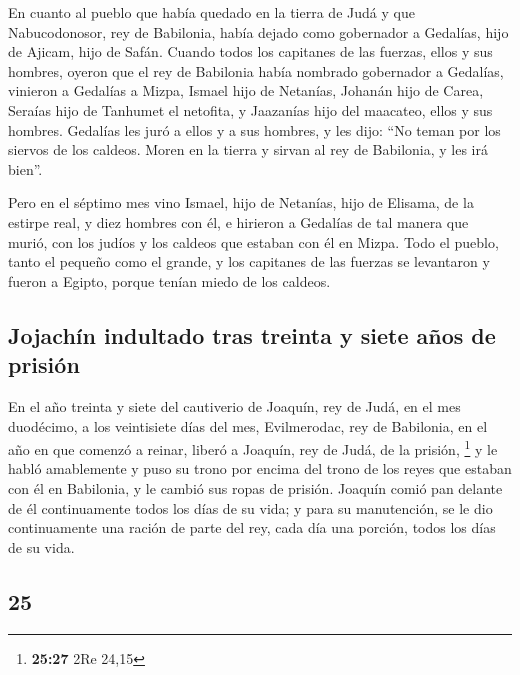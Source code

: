 \begin{paracol}{2}
 En cuanto al pueblo que había quedado en la tierra de
Judá y que Nabucodonosor, rey de Babilonia, había dejado como gobernador
a Gedalías, hijo de Ajicam, hijo de Safán.  Cuando todos
los capitanes de las fuerzas, ellos y sus hombres, oyeron que el rey de
Babilonia había nombrado gobernador a Gedalías, vinieron a Gedalías a
Mizpa, Ismael hijo de Netanías, Johanán hijo de Carea, Seraías hijo de
Tanhumet el netofita, y Jaazanías hijo del maacateo, ellos y sus
hombres.  Gedalías les juró a ellos y a sus hombres, y
les dijo: ``No teman por los siervos de los caldeos. Moren en la tierra
y sirvan al rey de Babilonia, y les irá bien''.

 Pero en el séptimo mes vino Ismael, hijo de Netanías,
hijo de Elisama, de la estirpe real, y diez hombres con él, e hirieron a
Gedalías de tal manera que murió, con los judíos y los caldeos que
estaban con él en Mizpa.  Todo el pueblo, tanto el
pequeño como el grande, y los capitanes de las fuerzas se levantaron y
fueron a Egipto, porque tenían miedo de los caldeos.

\hypertarget{jojachuxedn-indultado-tras-treinta-y-siete-auxf1os-de-prisiuxf3n}{%
\subsection{Jojachín indultado tras treinta y siete años de
prisión}\label{jojachuxedn-indultado-tras-treinta-y-siete-auxf1os-de-prisiuxf3n}}

 En el año treinta y siete del cautiverio de Joaquín, rey
de Judá, en el mes duodécimo, a los veintisiete días del mes,
Evilmerodac, rey de Babilonia, en el año en que comenzó a reinar, liberó
a Joaquín, rey de Judá, de la prisión, \footnote{\textbf{25:27} 2Re
  24,15}  y le habló amablemente y puso su trono por
encima del trono de los reyes que estaban con él en Babilonia,
 y le cambió sus ropas de prisión. Joaquín comió pan
delante de él continuamente todos los días de su vida;  y
para su manutención, se le dio continuamente una ración de parte del
rey, cada día una porción, todos los días de su vida. \switchcolumn
\begin{otherlanguage}{english}

\hypertarget{section-49}{%
\section{25}\label{section-49}}


\end{otherlanguage}
\end{paracol}
